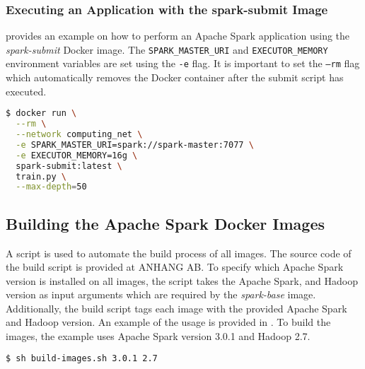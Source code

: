 \subsubsection{Executing an Application with the spark-submit Image}
% 
 provides an example on how to perform an Apache Spark application using the \textit{spark-submit} Docker image.
The \texttt{SPARK\_MASTER\_URI} and \texttt{EXECUTOR\_MEMORY} environment variables are set using the \texttt{-e} flag.
%
It is important to set the \texttt{--rm} flag which automatically removes the Docker container after the submit script has executed.
\begin{lstlisting}[label=lst:06_env_depl_submit_example, caption=Example of the spark-submit image, language=bash, numbers=none]
$ docker run \
  --rm \
  --network computing_net \
  -e SPARK_MASTER_URI=spark://spark-master:7077 \
  -e EXECUTOR_MEMORY=16g \
  spark-submit:latest \
  train.py \
  --max-depth=50
\end{lstlisting}


\subsection{Building the Apache Spark Docker Images}
\label{subsec:07_spark_building-images}
A script is used to automate the build process of all images.
The source code of the build script is provided at ANHANG AB.
To specify which Apache Spark version is installed on all images, the script takes the Apache Spark, and Hadoop version as input arguments which are required by the \textit{spark-base} image.
Additionally, the build script tags each image with the provided Apache Spark and Hadoop version.
An example of the usage is provided in .
To build the images, the example uses Apache Spark version 3.0.1 and Hadoop 2.7.
\begin{lstlisting}[label=lst:06_env_depl_build_example, caption=Example of the spark-submit image, language=bash, numbers=none]
$ sh build-images.sh 3.0.1 2.7
\end{lstlisting}



